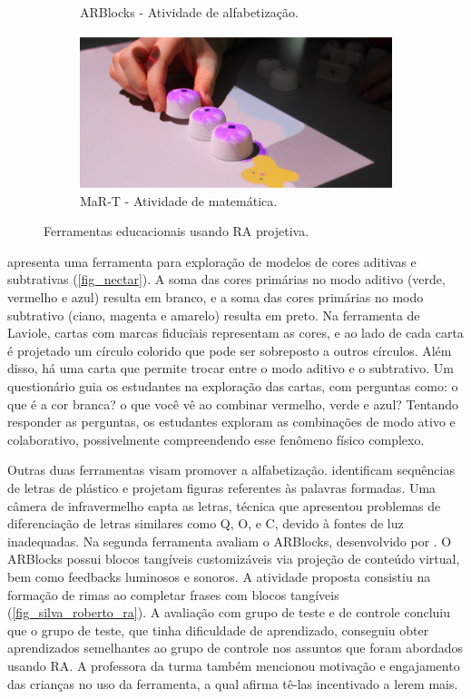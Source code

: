 \begin{figure}[h]
\begin{subfigure}{.49\textwidth}
        \caption{ARBlocks - Atividade de alfabetização.}
        \label{fig_silva_roberto_ra}
    \end{subfigure}
    \begin{subfigure}{.49\textwidth}
        \includegraphics[width=.9\linewidth,fbox]{figs/mart.png}
        \caption{MaR-T - Atividade de matemática.}
        \label{fig_math}
    \end{subfigure}
    \caption{Ferramentas educacionais usando RA projetiva.}
\end{figure}

 apresenta uma ferramenta para exploração de modelos de cores aditivas e subtrativas (\autoref{fig_nectar}). A soma das cores primárias no modo aditivo (verde, vermelho e azul) resulta em branco, e a soma das cores primárias no modo subtrativo (ciano, magenta e amarelo) resulta em preto. Na ferramenta de Laviole, cartas com marcas fiduciais representam as cores, e ao lado de cada carta é projetado um círculo colorido que pode ser sobreposto a outros círculos. Além disso, há uma carta que permite trocar entre o modo aditivo e o subtrativo. Um questionário guia os estudantes na exploração das cartas, com perguntas como: o que é a cor branca? o que você vê ao combinar vermelho, verde e azul? Tentando responder as perguntas, os estudantes exploram as combinações de modo ativo e colaborativo, possivelmente compreendendo esse fenômeno físico complexo.

Outras duas ferramentas visam promover a alfabetização.  identificam sequências de letras de plástico e projetam figuras referentes às palavras formadas. Uma câmera de infravermelho capta as letras, técnica que apresentou problemas de diferenciação de letras similares como Q, O, e C, devido à fontes de luz inadequadas. Na segunda ferramenta  avaliam o ARBlocks, desenvolvido por . O ARBlocks possui blocos tangíveis customizáveis via projeção de conteúdo virtual, bem como feedbacks luminosos e sonoros. A atividade proposta consistiu na formação de rimas ao completar frases com blocos tangíveis (\autoref{fig_silva_roberto_ra}). A avaliação com grupo de teste e de controle concluiu que o grupo de teste, que tinha dificuldade de aprendizado, conseguiu obter aprendizados semelhantes ao grupo de controle nos assuntos que foram abordados usando RA. A professora da turma também mencionou motivação e engajamento das crianças no uso da ferramenta, a qual afirma tê-las incentivado a lerem mais.

